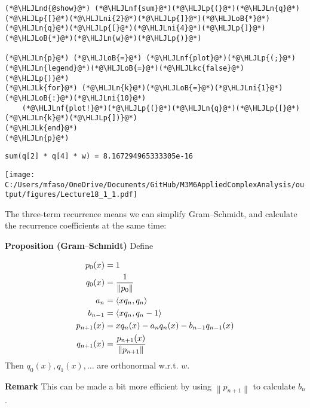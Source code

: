 \documentclass[12pt,landscape]{article}
\newcommand{\HLJLk}[1]{\textcolor[RGB]{148,91,176}{\textbf{#1}}}
\newcommand{\HLJLkc}[1]{\textcolor[RGB]{59,151,46}{\textit{#1}}}
\newcommand{\HLJLn}[1]{#1}
\newcommand{\HLJLnd}[1]{\textcolor[RGB]{214,102,97}{#1}}
\newcommand{\HLJLnf}[1]{\textcolor[RGB]{66,102,213}{#1}}
\newcommand{\HLJLni}[1]{\textcolor[RGB]{59,151,46}{#1}}
\newcommand{\HLJLoB}[1]{\textcolor[RGB]{102,102,102}{\textbf{#1}}}
\newcommand{\HLJLp}[1]{#1}
\def\ip<#1>{\left\langle{#1}\right\rangle}
\def\norm#1{\left\| #1 \right\|}
\def\endash{–}
\def\cent#1{\begin{center}#1\end{center} }
\begin{document}
{\begin{lstlisting}
(*@\HLJLnd{@show}@*) (*@\HLJLnf{sum}@*)(*@\HLJLp{(}@*)(*@\HLJLn{q}@*)(*@\HLJLp{[}@*)(*@\HLJLni{2}@*)(*@\HLJLp{]}@*)(*@\HLJLoB{*}@*)(*@\HLJLn{q}@*)(*@\HLJLp{[}@*)(*@\HLJLni{4}@*)(*@\HLJLp{]}@*)(*@\HLJLoB{*}@*)(*@\HLJLn{w}@*)(*@\HLJLp{)}@*)

(*@\HLJLn{p}@*) (*@\HLJLoB{=}@*) (*@\HLJLnf{plot}@*)(*@\HLJLp{(;}@*) (*@\HLJLn{legend}@*)(*@\HLJLoB{=}@*)(*@\HLJLkc{false}@*)(*@\HLJLp{)}@*)
(*@\HLJLk{for}@*) (*@\HLJLn{k}@*)(*@\HLJLoB{=}@*)(*@\HLJLni{1}@*)(*@\HLJLoB{:}@*)(*@\HLJLni{10}@*)
    (*@\HLJLnf{plot!}@*)(*@\HLJLp{(}@*)(*@\HLJLn{q}@*)(*@\HLJLp{[}@*)(*@\HLJLn{k}@*)(*@\HLJLp{])}@*)
(*@\HLJLk{end}@*)
(*@\HLJLn{p}@*)
\end{lstlisting}
\begin{lstlisting}
sum(q[2] * q[4] * w) = 8.167294965333305e-16
\end{lstlisting}

\cent{\texttt{[image: C:/Users/mfaso/OneDrive/Documents/GitHub/M3M6AppliedComplexAnalysis/output/figures/Lecture18\_1\_1.pdf]}}

The three-term recurrence means we can simplify Gram\ensuremath{\endash}Schmidt, and calculate the recurrence coefficients at the same time:

\textbf{Proposition (Gram\ensuremath{\endash}Schmidt)} Define


\begin{align*}
p_0(x) &= 1 \\
q_0(x) &= {1 \over \norm{p_0}}\\
a_n &= \ip<x q_n, q_n> \\
b_{n-1} &= \ip<x q_n, q_{n-1}>\\
p_{n+1}(x) &= x q_n(x) -  a_n q_n(x) -  b_{n-1} q_{n-1}(x)\\
q_{n+1}(x) &= {p_{n+1}(x) \over \norm{p_{n+1}}}
\end{align*}
Then $q_0(x), q_1(x), \ldots$ are orthonormal w.r.t. $w$.

\textbf{Remark} This can be made a bit more efficient by using $\norm{p_{n+1}}$ to calculate $b_n$.


}
\end{document}
